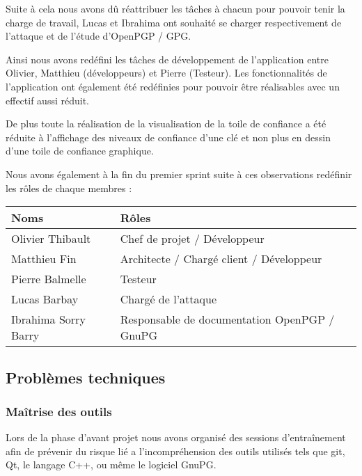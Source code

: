 \documentclass{../res/univ-projet}
\begin{document}
    Suite à cela nous avons dû réattribuer les tâches à chacun pour pouvoir tenir la charge de travail,
    Lucas et Ibrahima ont souhaité se charger respectivement de l'attaque et de l'étude d'OpenPGP / GPG.

    Ainsi nous avons redéfini les tâches de développement de l'application
    entre Olivier, Matthieu (développeurs) et Pierre (Testeur).
    Les fonctionnalités de l'application ont également été redéfinies pour pouvoir être réalisables avec un effectif
    aussi réduit.

    De plus toute la réalisation de la visualisation de la toile de confiance a été réduite
    à l'affichage des niveaux de confiance d'une clé et non plus en dessin d'une toile de confiance graphique.

    Nous avons également à la fin du premier sprint suite à ces observations redéfinir les rôles de chaque membres : 

    \begin{tabular}{|l|l|}
      \hline
      \bfseries{Noms}      & \bfseries{Rôles}                             \\
      \hline
      Olivier Thibault     & Chef de projet / Développeur                 \\
      Matthieu Fin         & Architecte / Chargé client / Développeur     \\
      Pierre Balmelle      & Testeur                                      \\
      Lucas Barbay         & Chargé de l'attaque                          \\
      Ibrahima Sorry Barry & Responsable de documentation OpenPGP / GnuPG \\
      \hline

    \end{tabular}

    
  \subsection{Problèmes techniques}

    \subsubsection{Maîtrise des outils}

      Lors de la phase d'avant projet nous avons organisé des sessions d’entraînement afin
      de prévenir du risque lié a l’incompréhension des outils utilisés tels que git, Qt, le langage C++,
      ou même le logiciel GnuPG.
\end{document}
